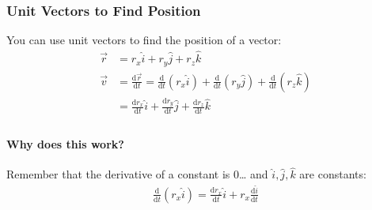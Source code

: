 \documentclass[
  letterpaper,
  DIV=11,
  numbers=noendperiod]{scrartcl}
\let\oldparagraph\paragraph
\renewcommand{\paragraph}[1]{\oldparagraph{#1}\mbox{}}
\begin{document}
\hypertarget{unit-vectors-to-find-position}{%
\subsubsection{Unit Vectors to Find
Position}\label{unit-vectors-to-find-position}}

You can use unit vectors to find the position of a vector:
\begin{align*}
\vec{r} &= r_x\hat{i} + r_y\hat{j} + r_z\hat{k} \\
\vec{v} &= \frac{\mathrm{d}\vec{r}}{\mathrm{d}{t}} = \frac{\mathrm{d}}{\mathrm{d}{t}}(r_x\hat{i}) + \frac{\mathrm{d}}{\mathrm{d}{t}}(r_y\hat{j}) + \frac{\mathrm{d}}{\mathrm{d}{t}}(r_z\hat{k}) \\
&= \frac{\mathrm{d}r_x}{\mathrm{d}t}\hat{i} + \frac{\mathrm{d}r_y}{\mathrm{d}t}\hat{j} + \frac{\mathrm{d}r_z}{\mathrm{d}t}\hat{k} \\
\end{align*}

\hypertarget{why-does-this-work}{%
\paragraph{Why does this work?}\label{why-does-this-work}}

Remember that the derivative of a constant is 0\ldots{} and
\(\hat{i}, \hat{j}, \hat{k}\) are constants: \begin{align*}
\frac{\mathrm{d}}{\mathrm{d}t}(r_x\hat{i}) = \frac{\mathrm{d}r_x}{\mathrm{d}t}\hat{i} + r_x\frac{\mathrm{d}\hat{i}}{\mathrm{d}t}
\end{align*}
\end{document}
